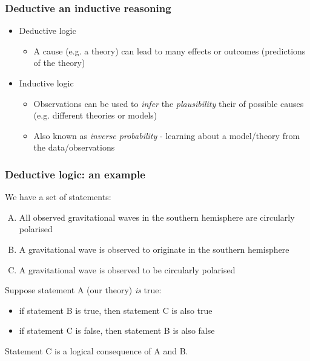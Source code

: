 \begin{frame}

\frametitle{Deductive an inductive reasoning}
\label{deductiveaninductivereasoning}

\begin{itemize}
\item Deductive logic

\begin{itemize}
\item A cause (e.g. a theory) can lead to many effects or outcomes (predictions of the theory)

\end{itemize}

\item Inductive logic

\begin{itemize}
\item Observations can be used to \emph{infer} the \emph{plausibility} their of possible causes (e.g.
different theories or models)

\item Also known as \emph{inverse probability} - learning about a model\slash theory from the data\slash observations

\end{itemize}

\end{itemize}

\end{frame}

\begin{frame}

\frametitle{Deductive logic: an example}
\label{deductivelogic:anexample}

We have a set of statements:

\begin{enumerate}[A.]
\item All observed gravitational waves in the southern hemisphere are circularly polarised
\item A gravitational wave is observed to originate in the southern hemisphere
\item A gravitational wave is observed to be circularly polarised
\end{enumerate}

Suppose statement A (our theory) \emph{is} true:

\begin{itemize}
\item if statement B is true, then statement C is also true

\item if statement C is false, then statement B is also false

\end{itemize}

Statement C is a logical consequence of A and B.

\end{frame}

